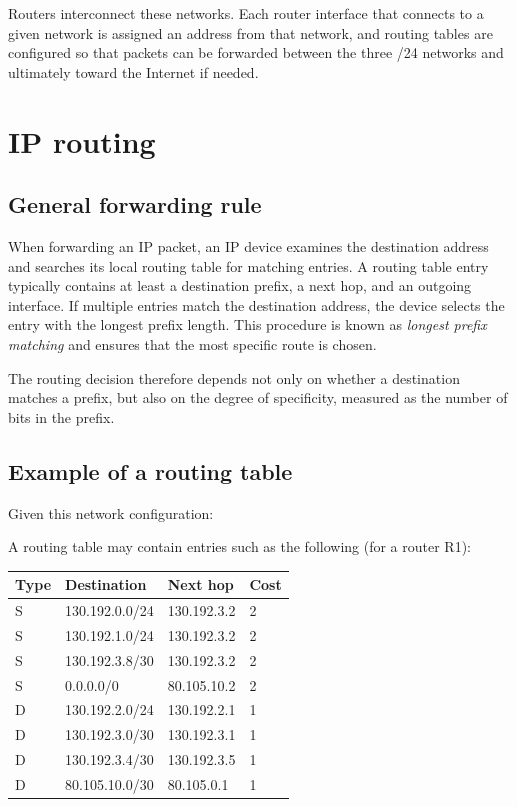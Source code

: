 Routers interconnect these networks. Each router interface that connects to a given network is assigned an address from that network, and routing tables are configured so that packets can be forwarded between the three /24 networks and ultimately toward the Internet if needed.

\section{IP routing}

\subsection{General forwarding rule}

When forwarding an IP packet, an IP device examines the destination address and searches its local routing table for matching entries. A routing table entry typically contains at least a destination prefix, a next hop, and an outgoing interface. If multiple entries match the destination address, the device selects the entry with the longest prefix length. This procedure is known as \emph{longest prefix matching} and ensures that the most specific route is chosen.

The routing decision therefore depends not only on whether a destination matches a prefix, but also on the degree of specificity, measured as the number of bits in the prefix.

\subsection{Example of a routing table}

Given this network configuration:

\begin{center}
\end{center}

A routing table may contain entries such as the following (for a router R1):

\begin{center}
\begin{tabular}{@{}llll@{}}
\toprule
\textbf{Type} & \textbf{Destination} & \textbf{Next hop} & \textbf{Cost}\\
\midrule
S & 130.192.0.0/24 & 130.192.3.2 & 2\\
S & 130.192.1.0/24 & 130.192.3.2 & 2\\
S & 130.192.3.8/30 & 130.192.3.2 & 2\\
S & 0.0.0.0/0 & 80.105.10.2 & 2\\
D & 130.192.2.0/24 & 130.192.2.1 & 1\\
D & 130.192.3.0/30 & 130.192.3.1 & 1\\
D & 130.192.3.4/30 & 130.192.3.5 & 1\\
D & 80.105.10.0/30 & 80.105.0.1 & 1\\
\bottomrule
\end{tabular}
\end{center}

